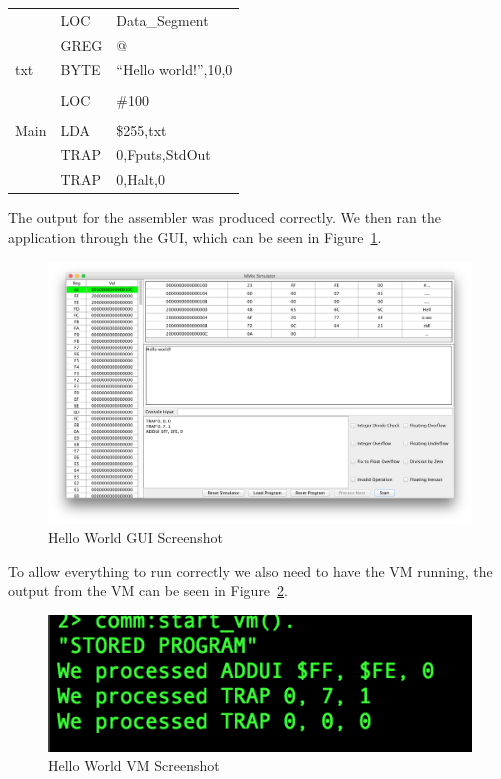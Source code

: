 \documentclass[a4paper,11pt]{report}
\begin{document}
\begin{centering}
\begin{tabular}{ l l l }
 & LOC & Data\_Segment\\
 & GREG & @\\
txt & BYTE & ``Hello world!'',10,0\\
\\
 & LOC & \#100\\
\\
Main & LDA & \$255,txt\\
 & TRAP & 0,Fputs,StdOut\\
 & TRAP & 0,Halt,0\\
\end{tabular}
\end{centering}

The output for the assembler was produced correctly. We then ran the application through the GUI, which can be seen in Figure~\ref{gui:helloworld}. 

\begin{figure}[ht!]
\centering
\includegraphics[width=\textwidth]{helloworld}
\caption{Hello World GUI Screenshot}
\label{gui:helloworld}
\end{figure}

To allow everything to run correctly we also need to have the VM running, the output from the VM can be seen in Figure~\ref{vm:helloworld}.

\begin{figure}[h!]
\centering
\includegraphics{HelloWorldVM}
\caption{Hello World VM Screenshot}
\label{vm:helloworld}
\end{figure}
\end{document}

